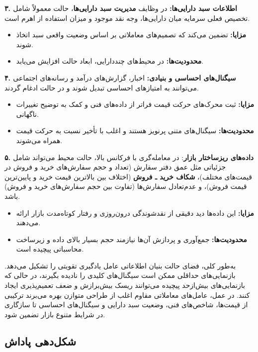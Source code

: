 \documentclass[12pt, a4paper]{report}
\begin{document}
\bigskip
\textbf{۳. اطلاعات سبد دارایی‌ها:}  
در وظایف \textbf{مدیریت سبد دارایی‌ها}، حالت معمولاً شامل تخصیص فعلی سرمایه میان دارایی‌ها، وجه نقد موجود و میزان استفاده از اهرم است.  
\begin{itemize}
    \item \textbf{مزایا:} تضمین می‌کند که تصمیم‌های معاملاتی بر اساس وضعیت واقعی سبد اتخاذ شوند.  
    \item \textbf{محدودیت‌ها:} در محیط‌های چنددارایی، ابعاد حالت افزایش می‌یابد.  
\end{itemize}

\bigskip
\textbf{۴. سیگنال‌های احساسی و بنیادی:}  
اخبار، گزارش‌های درآمد و رسانه‌های اجتماعی می‌توانند به امتیازهای احساسی تبدیل شوند و در حالت ادغام گردند.  
\begin{itemize}
    \item \textbf{مزایا:} ثبت محرک‌های حرکت قیمت فراتر از داده‌های فنی و کمک به توضیح تغییرات ناگهانی.  
    \item \textbf{محدودیت‌ها:} سیگنال‌های متنی پرنویز هستند و اغلب با تأخیر نسبت به حرکت قیمت همراه می‌شوند.  
\end{itemize}

\bigskip

\textbf{۵. داده‌های ریزساختار بازار}:  
در معامله‌گری با فرکانس بالا، حالت محیط می‌تواند شامل جزئیاتی مثل عمق دفتر سفارش (تعداد و حجم سفارش‌های خرید و فروش در قیمت‌های مختلف)، 
\textbf{شکاف خرید ـ فروش} (اختلاف بین بالاترین قیمت خرید و پایین‌ترین قیمت فروش)، 
و عدم‌تعادل سفارش‌ها (تفاوت بین حجم سفارش‌های خرید و فروش) باشد.  

\begin{itemize}
    \item \textbf{مزایا:} این داده‌ها دید دقیقی از نقدشوندگی درون‌روزی و رفتار کوتاه‌مدت بازار ارائه می‌دهند.  
    \item \textbf{محدودیت‌ها:} جمع‌آوری و پردازش آن‌ها نیازمند حجم بسیار بالای داده و زیرساخت محاسباتی پیچیده است.  
\end{itemize}


\bigskip
به‌طور کلی، فضای حالت بنیان اطلاعاتی عامل یادگیری تقویتی را تشکیل می‌دهد. بازنمایی‌های حداقلی ممکن است سیگنال‌های کلیدی را نادیده بگیرند، در حالی که بازنمایی‌های بیش‌ازحد پیچیده می‌توانند ریسک بیش‌برازش و ضعف تعمیم‌پذیری ایجاد کنند. در عمل، عامل‌های معاملاتی مقاوم اغلب از طراحی متوازن بهره می‌برند  ترکیبی از قیمت‌ها، شاخص‌های فنی، وضعیت سبد دارایی و سیگنال‌های احساسی  تا سازگاری در شرایط متنوع بازار تضمین شود.  

\subsection{شکل‌دهی پاداش\protect\footnotemark}\label{subsec:reward-shaping}
\end{document}
